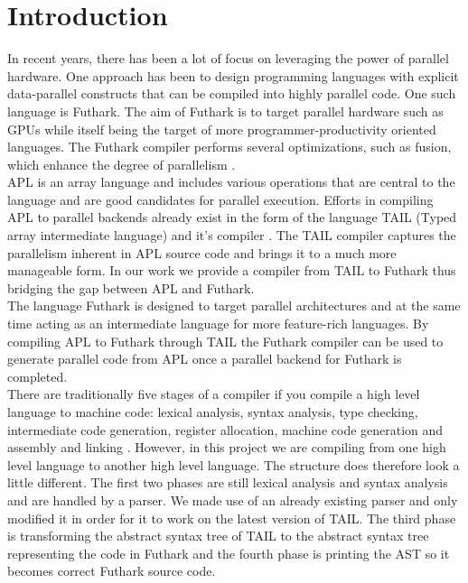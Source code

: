 \documentclass[11pt]{article}
\begin{document}
\section{Introduction}
In recent years, there has been a lot of focus on leveraging the power of parallel hardware. 
One approach has been to design programming languages with explicit data-parallel constructs that can be compiled 
into highly parallel code. One such language is Futhark. The aim of Futhark is to target parallel hardware such as 
GPUs while itself being the target of more programmer-productivity oriented languages. The Futhark compiler 
performs several optimizations, such as fusion, which enhance the degree of 
parallelism \cite{T.Henriksen&C.Oancea}.\\

APL is an array language and includes various operations that are central to the language and are good candidates 
for parallel execution. Efforts in compiling APL to parallel backends already exist in the form of the language 
TAIL (Typed array intermediate language) and it’s compiler \cite{ElsmanDybdal:Array:2014}.
The TAIL compiler captures the parallelism inherent in APL source code and brings it to a much more manageable form.
In our work we provide a compiler from TAIL 
to Futhark thus bridging the gap between APL and Futhark.\\

The language Futhark is designed to target parallel architectures and at the same time acting 
as an intermediate language for more feature-rich languages. By compiling APL to Futhark through TAIL the 
Futhark compiler can be used to generate parallel code from APL once a parallel backend for 
Futhark is completed.\\

There are traditionally five stages of a compiler if you compile a high level language to machine code: 
lexical analysis, syntax analysis, type checking, intermediate code generation, register allocation, machine 
code generation and assembly and linking \cite{TorbenMogensen}. However, in this project we are compiling from 
one high level language to another high level language. The structure does therefore look a little different. 
The first two phases are still lexical analysis and syntax analysis and are handled by a parser.
We made use of an already existing parser \cite{APLACC} and only modified it in order for it to work on the latest 
version of TAIL. The third phase is transforming the abstract syntax tree of TAIL to the abstract syntax tree 
representing the code in Futhark and the fourth phase is printing the AST so it becomes correct 
Futhark source code. \\
\end{document}
